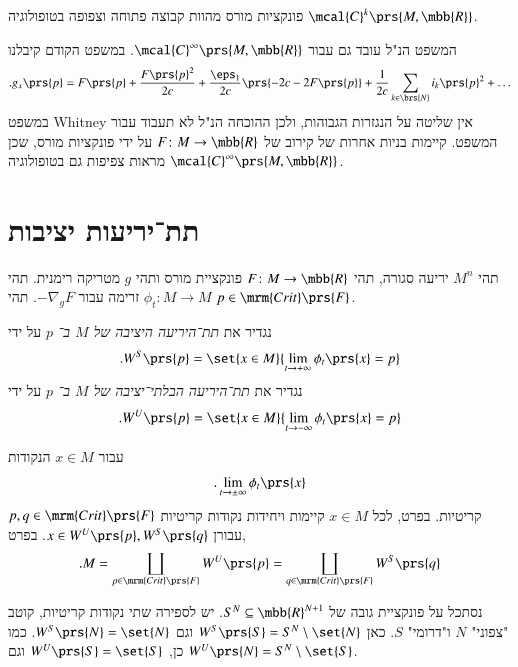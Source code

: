 \documentclass[a4paper,10pt,twoside,openany]{book}
\begin{document}
\begin{corollary}
פונקציות מורס מהוות קבוצה פתוחה וצפופה בטופולוגיה
$\mcal{C}^k\prs{M,\mbb{R}}$.
\end{corollary}

\begin{remark}
המשפט הנ"ל עובד גם עבור
$\mcal{C}^\infty\prs{M,\mbb{R}}$.
במשפט הקודם קיבלנו
\[\text{.} g_x\prs{p} = F\prs{p} + \frac{F\prs{p}^2}{2c} + \frac{\eps_1}{2c} \prs{- 2c - 2F\prs{p}} + \frac{1}{2c} \sum_{k \in \brs{N}} i_k\prs{p}^2 + \ldots\]
במשפט
\textenglish{Whitney}
אין שליטה על הנגזרות הגבוהות, ולכן ההוכחה הנ"ל לא תעבוד עבור המשפט.
קיימות בניות אחרות של קירוב של
$F \colon M \to \mbb{R}$
על ידי פונקציות מורס, שכן מראות צפיפות גם בטופולוגיה
$\mcal{C}^\infty\prs{M,\mbb{R}}$.
\end{remark}

\section{תת־יריעות יציבות}

\begin{definition}
תהי
$M^n$
יריעה סגורה, תהי
$F \colon M \to \mbb{R}$
פונקציית מורס ותהי
$g$
מטריקה רימנית.
תהי
$\phi_t \colon M \to M$
זרימה עבור
$- \nabla_g F$.
תהי
$p \in \mrm{Crit}\prs{F}$.

נגדיר את
\emph{תת־היריעה היציבה של
$M$
ב־%
$p$}
על ידי
\[\text{.} W^S\prs{p} = \set{x \in M}{\lim_{t \to +\infty} \phi_t\prs{x} = p}\]
נגדיר את
\emph{תת־היריעה הבלתי־יציבה של
$M$
ב־%
$p$}
על ידי
\[\text{.} W^U\prs{p} = \set{x \in M}{\lim_{t \to -\infty} \phi_t\prs{x} = p}\]
\end{definition}

\begin{remark}
עבור
$x \in M$
הנקודות
\[\text{.} \lim_{t \to \pm \infty} \phi_t\prs{x}\]
קריטיות.
בפרט, לכל
$x \in M$
קיימות ויחידות נקודות קריטיות
$p,q \in \mrm{Crit}\prs{F}$
עבורן
$x \in W^U\prs{p}, W^S\prs{q}$.
בפרט,
\begin{align*}
\text{.} M = \coprod_{p \in \mrm{Crit}\prs{F}} W^U\prs{p} = \coprod_{q \in \mrm{Crit}\prs{F}} W^S\prs{q}
\end{align*}
\end{remark}

\begin{example}
נסתכל על פונקציית גובה של
$S^N \subseteq \mbb{R}^{N+1}$.
יש לספירה שתי נקודות קריטיות, קוטב "צפוני"
$N$
ו"דרומי"
$S$.
כאן
$W^S\prs{S} = S^N \setminus \set{N}$
וגם
$W^S\prs{N} = \set{N}$.
כמו כן,
$W^U\prs{S} = \set{S}$
וגם
$W^U\prs{N} = S^N \setminus \set{S}$.
\end{example}
\end{document}
